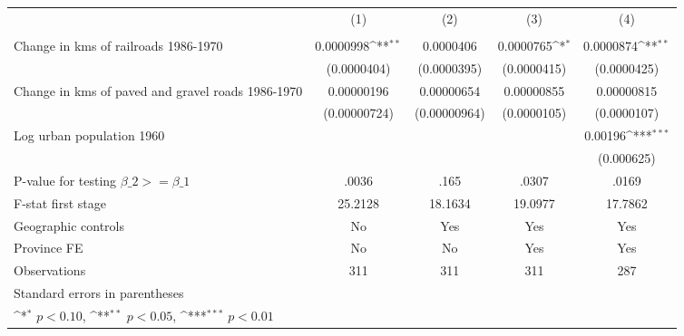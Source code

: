 {
\def\sym#1{\ifmmode^{#1}\else\(^{#1}\)\fi}
\begin{tabular}{l*{4}{c}}
\hline\hline
                &\multicolumn{1}{c}{(1)}&\multicolumn{1}{c}{(2)}&\multicolumn{1}{c}{(3)}&\multicolumn{1}{c}{(4)}\\
                &\multicolumn{1}{c}{}&\multicolumn{1}{c}{}&\multicolumn{1}{c}{}&\multicolumn{1}{c}{}\\
\hline
Change in kms of railroads 1986-1970&0.0000998\sym{**} &0.0000406         &0.0000765\sym{*}  &0.0000874\sym{**} \\
                &(0.0000404)         &(0.0000395)         &(0.0000415)         &(0.0000425)         \\
[1em]
Change in kms of paved and gravel roads 1986-1970&0.00000196         &0.00000654         &0.00000855         &0.00000815         \\
                &(0.00000724)         &(0.00000964)         &(0.0000105)         &(0.0000107)         \\
[1em]
Log urban population 1960&                  &                  &                  &  0.00196\sym{***}\\
                &                  &                  &                  &(0.000625)         \\
\hline
P-value for testing $\beta\_{2} >= \beta\_{1}$&    .0036         &     .165         &    .0307         &    .0169         \\
F-stat first stage&  25.2128         &  18.1634         &  19.0977         &  17.7862         \\
Geographic controls&       No         &      Yes         &      Yes         &      Yes         \\
Province FE     &       No         &       No         &      Yes         &      Yes         \\
Observations    &      311         &      311         &      311         &      287         \\
\hline\hline
\multicolumn{5}{l}{\footnotesize Standard errors in parentheses}\\
\multicolumn{5}{l}{\footnotesize \sym{*} \(p<0.10\), \sym{**} \(p<0.05\), \sym{***} \(p<0.01\)}\\
\end{tabular}
}
